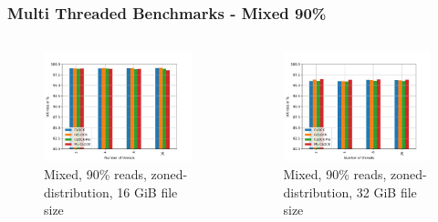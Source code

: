 \documentclass[
	aspectratio=169,
	compress,
]{beamer}
\newcommand{\navframetitle}[1]{\frametitle{#1\hfill{\footnotesize\lastsection{}}}}
\begin{document}
\begin{frame}[fragile]
	\navframetitle{Multi Threaded Benchmarks - Mixed 90\%}

	\begin{columns}
		\begin{column}{0.5\textwidth}
			\begin{figure}[ht]
    			\centering
    			\includegraphics[width=\textwidth]{multi_16_gb_rw_90to10_zoned.jpg}
        		\caption{Mixed, 90\% reads, zoned-distribution, 16 GiB file size}
			\end{figure}
		\end{column}
		\begin{column}{0.5\textwidth}
			\begin{figure}[ht]
    			\centering
    			\includegraphics[width=\textwidth]{multi_32_gb_rw_90to10_zoned.jpg}
        		\caption{Mixed, 90\% reads, zoned-distribution, 32 GiB file size}
			\end{figure}			
		\end{column}
	\end{columns}
\end{frame}
\end{document}
